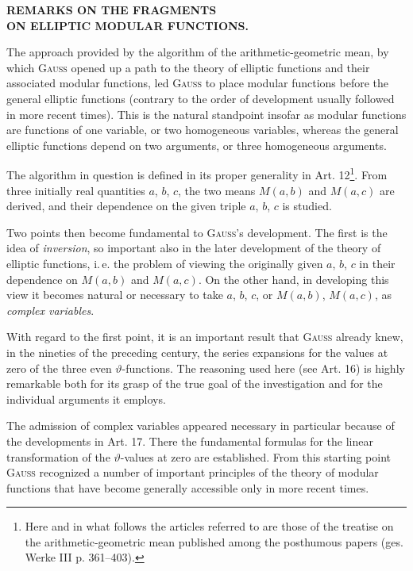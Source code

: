 \enlargethispage{2pt}

\begin{center}\textbf{REMARKS ON THE FRAGMENTS\\ ON ELLIPTIC MODULAR FUNCTIONS.}\end{center}

The approach provided by the algorithm of the arithmetic-geometric mean, by which \textsc{Gauss} opened up a path to the theory of elliptic functions and their associated modular functions, led \textsc{Gauss} to place modular functions before the general elliptic functions (contrary to the order of development usually followed in more recent times). This is the natural standpoint insofar as modular functions are functions of one variable, or two homogeneous variables, whereas the general elliptic functions depend on two arguments, or three homogeneous arguments.

The algorithm in question is defined in its proper generality in Art. 12\footnote{Here and in what follows the articles referred to are those of the treatise on the arithmetic-geometric mean published among the posthumous papers (ges. Werke III p. 361--403).}. From three initially real quantities $a$, $b$, $c$, the two means $M(a,b)$ and $M(a,c)$ are derived, and their dependence on the given triple $a$, $b$, $c$ is studied.

Two points then become fundamental to \textsc{Gauss}'s development. The first is the idea of \emph{inversion}, so important also in the later development of the theory of elliptic functions, i.\,e. the problem of viewing the originally given $a$, $b$, $c$ in their dependence on $M(a,b)$ and $M(a,c)$. On the other hand, in developing this view it becomes natural or necessary to take $a$, $b$, $c$, or $M(a,b)$, $M(a,c)$, as \emph{complex variables}.

With regard to the first point, it is an important result that \textsc{Gauss} already knew, in the nineties of the preceding century, the series expansions for the values at zero of the three even $\vartheta$-functions. The reasoning used here (see Art. 16) is highly remarkable both for its grasp of the true goal of the investigation and for the individual arguments it employs.

The admission of complex variables appeared necessary in particular because of the developments in Art. 17. There the fundamental formulas for the linear transformation of the $\vartheta$-values at zero are established. From this starting point \textsc{Gauss} recognized a number of important principles of the theory of modular functions that have become generally accessible only in more recent times.

